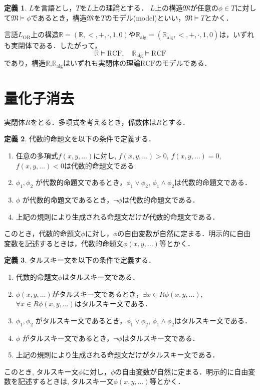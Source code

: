 \documentclass[uplatex, dvipdfmx]{jsarticle}
\newcommand{\R}{\mathbb{R}}
\newcommand{\Ralg}{\mathbb{R}_\mathrm{alg}}
\newcommand{\M}{\mathfrak{M}}
\newcommand{\RCF}{\mathrm{RCF}}
\theoremstyle{definition}
\newtheorem{definition}{定義}[section]
\begin{document}
\begin{definition}
     $L$を言語とし，$T$を$L$上の理論とする．
     $L$上の構造$\M$が任意の$\phi \in T$に対して$\M\models \phi$であるとき，構造$\M$を$T$のモデル(model)といい，$\M \models T$とかく．
\end{definition}

言語$L_\mathrm{OR}$上の構造$\R=(\R,<,+,\cdot,1,0)$や$\Ralg=(\Ralg,<,+,\cdot,1,0)$は，いずれも実閉体である．したがって，
\[
     \R \models \RCF, \quad \Ralg \models \RCF
\]
であり，構造$\R$,$\Ralg$はいずれも実閉体の理論$\RCF$のモデルである．

\section{量化子消去}
実閉体$R$をとる．多項式を考えるとき，係数体は$R$とする．


\begin{definition}
     代数的命題文を以下の条件で定義する．
     \begin{enumerate}
          \item 任意の多項式$f(x, y, \dots)$に対し, $f(x,y, \dots) > 0$, $f(x,y, \dots) = 0$, $f(x,y, \dots) < 0$は代数的命題文である.
          \item $\phi_1, \phi_2$ が代数的命題文であるとき，$\phi_1 \lor \phi_2$, $\phi_1 \land \phi_2$は代数的命題文である．
          \item $\phi$ が代数的命題文であるとき，$\lnot \phi$は代数的命題文である．
          \item 上記の規則により生成される命題文だけが代数的命題文である．
     \end{enumerate}
     このとき，代数的命題文$\phi$に対し，$\phi$の自由変数が自然に定まる．明示的に自由変数を記述するときは，代数的命題文$\phi(x,y,\dots)$等とかく．
\end{definition}

\begin{definition}
     タルスキー文を以下の条件で定義する．
     \begin{enumerate}
          \item 代数的命題文$\phi$はタルスキー文である．
          \item $\phi(x,y,\dots)$がタルスキー文であるとき，$\exists x \in R \phi(x,y,\dots)$, $\forall x \in R \phi(x,y,\dots)$はタルスキー文である．
          \item $\phi_1, \phi_2$ がタルスキー文であるとき，$\phi_1 \lor \phi_2$, $\phi_1 \land \phi_2$はタルスキー文である．
          \item $\phi$ がタルスキー文であるとき，$\lnot \phi$はタルスキー文である．
          \item 上記の規則により生成される命題文だけがタルスキー文である．
     \end{enumerate}
     このとき, タルスキー文$\phi$に対し，$\phi$の自由変数が自然に定まる．明示的に自由変数を記述するときは, タルスキー文$\phi(x, y, \dots)$等とかく． 
\end{definition}
\end{document}
